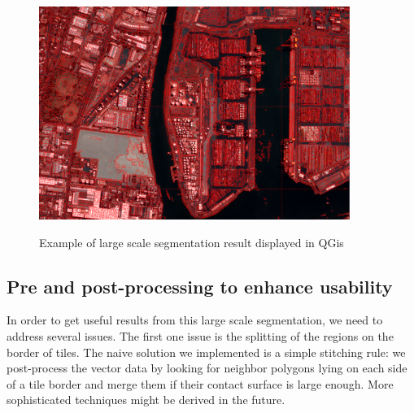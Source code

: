 \documentclass{josis}
\begin{document}
\begin{figure}[!htb]
\centering
\includegraphics[width=0.9\textwidth]{Pictures/ogrs_nostitch.png}\label{fig:nostitch}
\caption{Example of large scale segmentation result displayed in QGis}
\end{figure}


\subsection{Pre and post-processing to enhance usability}

In order to get useful results from this large scale segmentation, we
need to address several issues. The first one issue is the splitting
of the regions on the border of tiles. The naive solution we
implemented is a simple stitching rule: we post-process the vector
data by looking for neighbor polygons lying on each side of a tile
border and merge them if their contact surface is large enough. More
sophisticated techniques might be derived in the future.
\end{document}
